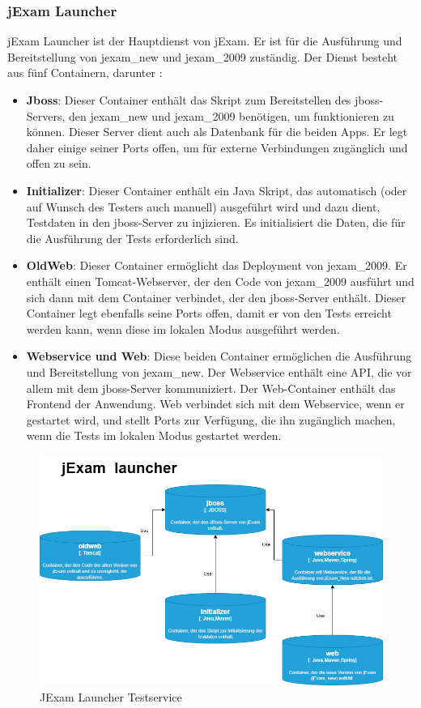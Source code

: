 \subsubsection{jExam Launcher}

jExam Launcher ist der Hauptdienst von jExam. Er ist für die Ausführung
und Bereitstellung von \Gls{jexam_new} und \Gls{jexam_2009} zuständig. Der Dienst
besteht aus fünf Containern, darunter :

\begin{itemize}
    \setlength\itemsep{1em}

    \item[] \textbf{Jboss}: Dieser Container enthält das Skript zum
    Bereitstellen des jboss-Servers, den \Gls{jexam_new} und \Gls{jexam_2009}
    benötigen, um funktionieren zu können. Dieser Server dient auch
    als Datenbank für die beiden Apps. Er legt daher einige seiner
    Ports offen, um für externe Verbindungen zugänglich und offen
    zu sein.

    \item[] \textbf{Initializer}: Dieser Container enthält ein
    Java Skript, das automatisch (oder auf Wunsch des Testers auch
    manuell) ausgeführt wird und dazu dient, Testdaten in den 
    jboss-Server zu injizieren. Es initialisiert die Daten, die für 
    die Ausführung der Tests erforderlich sind.

    \item[] \textbf{OldWeb}: Dieser Container ermöglicht das
    Deployment von \Gls{jexam_2009}. Er enthält einen Tomcat-Webserver,
    der den Code von \Gls{jexam_2009} ausführt und sich dann mit
    dem Container verbindet, der den jboss-Server enthält. 
    Dieser Container legt ebenfalls seine Ports offen, damit er
    von den Tests erreicht werden kann, wenn diese im lokalen 
    Modus ausgeführt werden.

    \item[] \textbf{Webservice und Web}: Diese beiden Container
    ermöglichen die Ausführung und Bereitstellung von
    \Gls{jexam_new}. Der Webservice enthält eine API, die vor
    allem mit dem jboss-Server kommuniziert. Der Web-Container
    enthält das Frontend der Anwendung. Web verbindet sich mit
    dem Webservice, wenn er gestartet wird, und stellt Ports zur
    Verfügung, die ihn zugänglich machen, wenn die Tests im
    lokalen Modus gestartet werden.
\end{itemize}

\begin{figure}[H]
    \centering
    \includegraphics[scale=0.6]{images/launcher.drawio}
    \caption{JExam Launcher Testservice} \label{fig:laucher}
\end{figure}